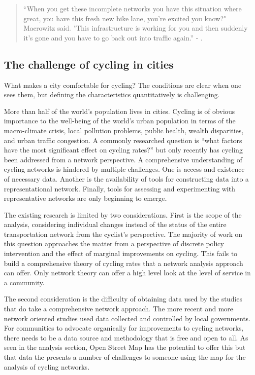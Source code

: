 

\begin{quote}
``When you get these incomplete networks you have this situation where great, you have this fresh new bike lane, you're excited you know?" Maerowitz said. "This infrastructure is working for you and then suddenly it's gone and you have to go back out into traffic again.'' - \cite{juhasz2019}.
\end{quote}
 
\subsection{The challenge of cycling in cities}

What makes a city comfortable for cycling? The conditions are clear when one sees them, but defining the characteristics quantitatively is challenging. 

More than half of the world's population lives in cities. Cycling is of obvious importance to the well-being of the world's  urban population in terms of the macro-climate crisis, local pollution problems,  public health, wealth disparities, and urban traffic congestion. A commonly researched question is ``what factors have the most significant effect on cycling rates?'' but only recently has cycling been addressed from a network perspective. A comprehensive understanding of cycling networks is hindered by multiple challenges. One is access and existence of necessary data. Another is the availability of tools for constructing data into a representational network. Finally, tools for assessing and experimenting with representative networks are only beginning to emerge.   

The existing research is limited by two considerations. First is the scope of the analysis, considering individual changes instead of the status of the entire transportation network from the cyclist's perspective.  The majority of work on this question approaches the matter from a perspective of discrete policy intervention and the effect of marginal improvements on cycling. This fails to build a comprehensive theory of cycling rates that a network analysis approach can offer. Only network theory can offer a high level look at the level of service in a community. 

The second consideration is the difficulty of obtaining data used by the studies that do take a comprehensive network approach. The more recent and more network oriented studies used data collected and controlled by local governments. For communities to advocate organically for improvements to cycling networks, there needs to be a data source and methodology that is free and open to all. As seen in the analysis section, Open Street Map has the potential to offer this but that data the presents a number of challenges to someone using the map for the analysis of cycling networks. 

